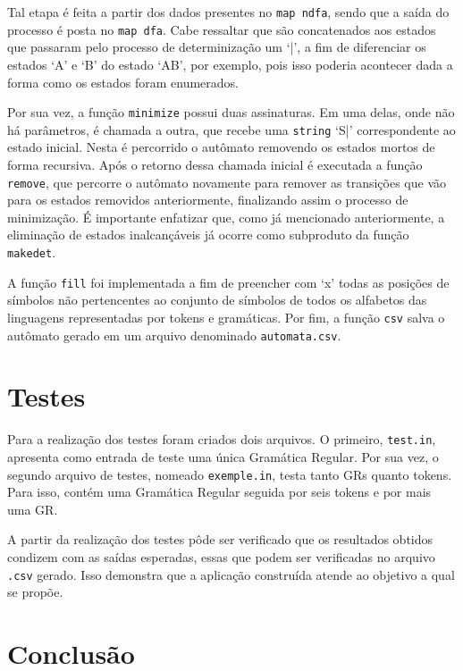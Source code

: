 \documentclass[12pt]{article}
\begin{document}
Tal etapa é feita a partir dos dados presentes no \texttt{map ndfa}, sendo que a saída do processo é posta no \texttt{map dfa}. Cabe ressaltar que são concatenados aos estados que passaram pelo processo de determinização um `|', a fim de diferenciar os estados `A' e `B' do estado `AB', por exemplo, pois isso poderia acontecer dada a forma como os estados foram enumerados.

Por sua vez, a função \texttt{minimize} possui duas assinaturas. Em uma delas, onde não há parâmetros, é chamada a outra, que recebe uma \texttt{string} `S|' correspondente ao estado inicial. Nesta é percorrido o autômato removendo os estados mortos de forma recursiva. Após o retorno dessa chamada inicial é executada a função \texttt{remove}, que percorre o autômato novamente para remover as transições que vão para os estados removidos anteriormente, finalizando assim o processo de minimização. É importante enfatizar que, como já mencionado anteriormente, a eliminação de estados inalcançáveis já ocorre como subproduto da função \texttt{makedet}.

A função \texttt{fill} foi implementada a fim de preencher com `x' todas as posições de símbolos não pertencentes ao conjunto de símbolos de todos os alfabetos das linguagens representadas por tokens e gramáticas. Por fim, a função \texttt{csv} salva o autômato gerado em um arquivo denominado \texttt{automata.csv}.

\section{Testes}
\label{5}

Para a realização dos testes foram criados dois arquivos. O primeiro, \texttt{test.in}, apresenta como entrada de teste uma única Gramática Regular. Por sua vez, o segundo arquivo de testes, nomeado \texttt{exemple.in}, testa tanto GRs quanto tokens. Para isso, contém uma Gramática Regular seguida por seis tokens e por mais uma GR.

A partir da realização dos testes pôde ser verificado que os resultados obtidos condizem com as saídas esperadas, essas que podem ser verificadas no arquivo \texttt{.csv} gerado. Isso demonstra que a aplicação construída atende ao objetivo a qual se propõe.

\section{Conclusão}
\label{6}
\end{document}
